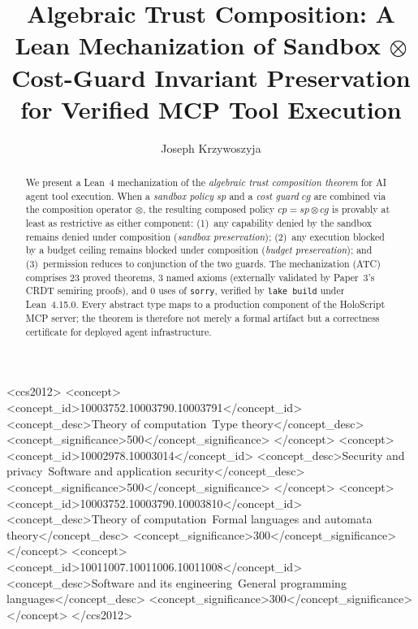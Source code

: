 \documentclass[sigconf]{acmart}
\newcommand{\compose}{\mathbin{\otimes}}
\newcommand{\ATC}{\textsc{ATC}}
\newcommand{\SP}{\mathit{sp}}
\newcommand{\CG}{\mathit{cg}}
\newcommand{\CP}{\mathit{cp}}
\begin{document}
\title{Algebraic Trust Composition: A Lean Mechanization of Sandbox $\compose$
       Cost-Guard Invariant Preservation for Verified MCP Tool Execution}

\author{Joseph Krzywoszyja}

\begin{abstract}
We present a Lean~4 mechanization of the \emph{algebraic trust composition
theorem} for AI agent tool execution.  When a \emph{sandbox policy} $\SP$ and
a \emph{cost guard} $\CG$ are combined via the composition operator
$\compose$, the resulting composed policy $\CP = \SP \compose \CG$ is
provably at least as restrictive as either component: (1)~any capability
denied by the sandbox remains denied under composition
(\emph{sandbox preservation}); (2)~any execution blocked by a budget
ceiling remains blocked under composition (\emph{budget preservation});
and (3)~permission reduces to conjunction of the two guards.  The
mechanization (\ATC{}) comprises 23 proved theorems, 3 named axioms
(externally validated by Paper~3's CRDT semiring proofs), and 0 uses
of \texttt{sorry}, verified by \texttt{lake build} under Lean~4.15.0.
Every abstract type maps to a production component of the HoloScript
MCP server; the theorem is therefore not merely a formal artifact but
a correctness certificate for deployed agent infrastructure.
\end{abstract}

\begin{CCSXML}
<ccs2012>
  <concept>
    <concept_id>10003752.10003790.10003791</concept_id>
    <concept_desc>Theory of computation~Type theory</concept_desc>
    <concept_significance>500</concept_significance>
  </concept>
  <concept>
    <concept_id>10002978.10003014</concept_id>
    <concept_desc>Security and privacy~Software and application security</concept_desc>
    <concept_significance>500</concept_significance>
  </concept>
  <concept>
    <concept_id>10003752.10003790.10003810</concept_id>
    <concept_desc>Theory of computation~Formal languages and automata theory</concept_desc>
    <concept_significance>300</concept_significance>
  </concept>
  <concept>
    <concept_id>10011007.10011006.10011008</concept_id>
    <concept_desc>Software and its engineering~General programming languages</concept_desc>
    <concept_significance>300</concept_significance>
  </concept>
</ccs2012>
\end{CCSXML}
\end{document}
